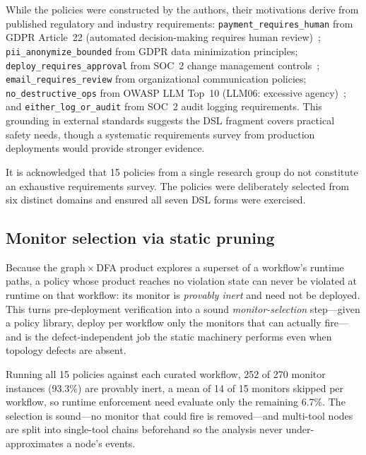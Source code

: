 While the policies were constructed by the authors, their motivations
derive from published regulatory and industry requirements:
\texttt{payment\_requires\_human} from GDPR Article~22 (automated
decision-making requires human review)~\citep{gdpr_article22};
\texttt{pii\_anonymize\_bounded} from GDPR data minimization
principles; \texttt{deploy\_requires\_approval} from SOC~2 change
management controls~\citep{aicpa_soc2};
\texttt{email\_requires\_review} from organizational communication
policies; \texttt{no\_destructive\_ops} from OWASP LLM Top~10 (LLM06:
excessive agency)~\citep{owasp_llm_top10}; and
\texttt{either\_log\_or\_audit} from SOC~2 audit logging requirements.
This grounding in external standards suggests the DSL fragment covers
practical safety needs, though a systematic requirements survey from
production deployments would provide stronger evidence.

It is acknowledged that 15 policies from a single research group do not
constitute an exhaustive requirements survey. The policies were
deliberately selected from six distinct domains and ensured all seven
DSL forms were exercised.

\subsection{Monitor selection via static pruning}
\label{sec:pruning}

Because the graph\,$\times$\,DFA product explores a superset of a workflow's
runtime paths, a policy whose product reaches no violation state can never be
violated at runtime on that workflow: its monitor is \emph{provably inert} and
need not be deployed. This turns pre-deployment verification into a sound
\emph{monitor-selection} step---given a policy library, deploy per workflow only
the monitors that can actually fire---and is the defect-independent job the
static machinery performs even when topology defects are absent.

Running all 15 policies against each curated workflow, 252 of 270 monitor
instances (93.3\%) are provably inert, a mean of 14 of 15 monitors skipped per
workflow, so runtime enforcement need evaluate only the remaining 6.7\%. The
selection is sound---no monitor that could fire is removed---and multi-tool nodes
are split into single-tool chains beforehand so the analysis never
under-approximates a node's events.

